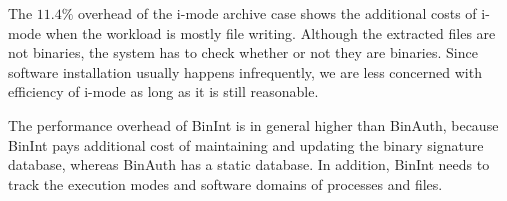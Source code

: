 The $11.4\%$ overhead of the i-mode archive case
shows the additional costs of i-mode when the workload is mostly file writing.
Although the extracted files are not binaries, the system
has to check whether or not they are binaries.
Since software installation usually happens infrequently,
we are less concerned with efficiency of
i-mode as long as it is still reasonable.

The performance overhead of BinInt is in general higher than BinAuth,
because BinInt pays additional cost of maintaining and updating the
binary signature database, whereas BinAuth has a static database.
In addition, BinInt needs to track the execution modes and software domains
of processes and files.
